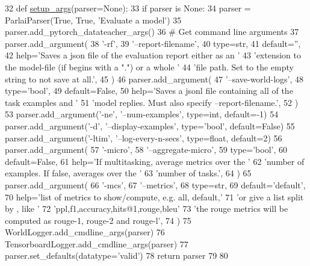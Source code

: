 \begin{DoxyCode}
32 \textcolor{keyword}{def }\hyperlink{namespaceparlai_1_1scripts_1_1eval__model_a2eaba0aa76c4d83e2a0f7f77c23479c8}{setup\_args}(parser=None):
33     \textcolor{keywordflow}{if} parser \textcolor{keywordflow}{is} \textcolor{keywordtype}{None}:
34         parser = ParlaiParser(\textcolor{keyword}{True}, \textcolor{keyword}{True}, \textcolor{stringliteral}{'Evaluate a model'})
35     parser.add\_pytorch\_datateacher\_args()
36     \textcolor{comment}{# Get command line arguments}
37     parser.add\_argument(
38         \textcolor{stringliteral}{'-rf'},
39         \textcolor{stringliteral}{'--report-filename'},
40         type=str,
41         default=\textcolor{stringliteral}{''},
42         help=\textcolor{stringliteral}{'Saves a json file of the evaluation report either as an '}
43         \textcolor{stringliteral}{'extension to the model-file (if begins with a ".") or a whole '}
44         \textcolor{stringliteral}{'file path. Set to the empty string to not save at all.'},
45     )
46     parser.add\_argument(
47         \textcolor{stringliteral}{'--save-world-logs'},
48         type=\textcolor{stringliteral}{'bool'},
49         default=\textcolor{keyword}{False},
50         help=\textcolor{stringliteral}{'Saves a jsonl file containing all of the task examples and '}
51         \textcolor{stringliteral}{'model replies. Must also specify --report-filename.'},
52     )
53     parser.add\_argument(\textcolor{stringliteral}{'-ne'}, \textcolor{stringliteral}{'--num-examples'}, type=int, default=-1)
54     parser.add\_argument(\textcolor{stringliteral}{'-d'}, \textcolor{stringliteral}{'--display-examples'}, type=\textcolor{stringliteral}{'bool'}, default=\textcolor{keyword}{False})
55     parser.add\_argument(\textcolor{stringliteral}{'-ltim'}, \textcolor{stringliteral}{'--log-every-n-secs'}, type=float, default=2)
56     parser.add\_argument(
57         \textcolor{stringliteral}{'-micro'},
58         \textcolor{stringliteral}{'--aggregate-micro'},
59         type=\textcolor{stringliteral}{'bool'},
60         default=\textcolor{keyword}{False},
61         help=\textcolor{stringliteral}{'If multitasking, average metrics over the '}
62         \textcolor{stringliteral}{'number of examples. If false, averages over the '}
63         \textcolor{stringliteral}{'number of tasks.'},
64     )
65     parser.add\_argument(
66         \textcolor{stringliteral}{'-mcs'},
67         \textcolor{stringliteral}{'--metrics'},
68         type=str,
69         default=\textcolor{stringliteral}{'default'},
70         help=\textcolor{stringliteral}{'list of metrics to show/compute, e.g. all, default,'}
71         \textcolor{stringliteral}{'or give a list split by , like '}
72         \textcolor{stringliteral}{'ppl,f1,accuracy,hits@1,rouge,bleu'}
73         \textcolor{stringliteral}{'the rouge metrics will be computed as rouge-1, rouge-2 and rouge-l'},
74     )
75     WorldLogger.add\_cmdline\_args(parser)
76     TensorboardLogger.add\_cmdline\_args(parser)
77     parser.set\_defaults(datatype=\textcolor{stringliteral}{'valid'})
78     \textcolor{keywordflow}{return} parser
79 
80 
\end{DoxyCode}


